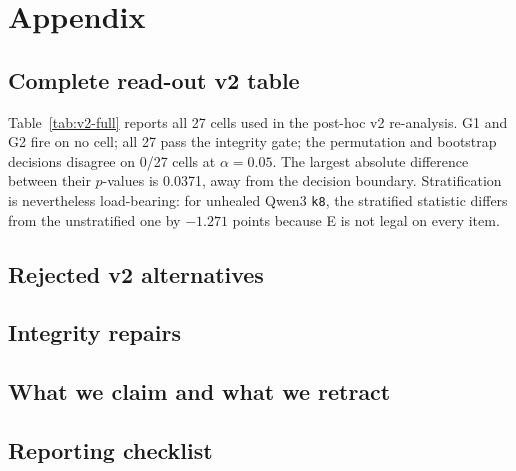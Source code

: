 \section{Appendix}

\subsection{Complete read-out v2 table}

Table~\ref{tab:v2-full} reports all 27 cells used in the post-hoc v2 re-analysis. G1 and G2 fire on no cell; all 27 pass the integrity gate; the permutation and bootstrap decisions disagree on 0/27 cells at $\alpha=0.05$. The largest absolute difference between their $p$-values is 0.0371, away from the decision boundary. Stratification is nevertheless load-bearing: for unhealed Qwen3 \texttt{k8}, the stratified statistic differs from the unstratified one by $-1.271$ points because E is not legal on every item.



\FloatBarrier

\subsection{Rejected v2 alternatives}



\FloatBarrier

\subsection{Integrity repairs}



\FloatBarrier

\subsection{What we claim and what we retract}
\label{app:ledger}



\FloatBarrier

\subsection{Reporting checklist}

